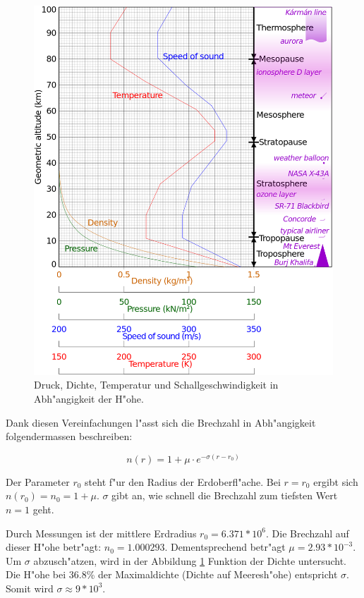 \begin{refsection}
\begin{figure}
  \centering
  \includegraphics[scale=0.24]{licht/images/athmosphereProfile.png}
  
  \caption{Druck, Dichte, Temperatur und Schallgeschwindigkeit in Abh"angigkeit der H"ohe. \label{fig:athmosphere_profile}}
\end{figure}

Dank diesen Vereinfachungen l"asst sich die Brechzahl in Abh"angigkeit folgendermassen beschreiben:

$$n(r) = 1 + \mu \cdot e^{-\sigma (r - r_0)}$$

Der Parameter $r_0$ steht f"ur den Radius der Erdoberfl"ache. 
Bei $r = r_0$ ergibt sich $n(r_0) = n_0 = 1 + \mu$. 
$\sigma$ gibt an, wie schnell die Brechzahl zum tiefsten Wert $n = 1$ geht. 




Durch Messungen ist der mittlere Erdradius $r_0 = 6.371 * 10^6$. 
Die Brechzahl auf dieser H"ohe betr"agt: $n_0 = 1.000293$.
Dementsprechend betr"agt $\mu = 2.93 * 10^{-3}$. 
Um $\sigma$ abzusch"atzen, wird in der Abbildung \ref{fig:athmosphere_profile} Funktion der Dichte untersucht. 
Die H"ohe bei 36.8\% der Maximaldichte (Dichte auf Meeresh"ohe) entspricht $\sigma$. 
Somit wird $\sigma \approx 9 * 10^3$.


\end{refsection}
